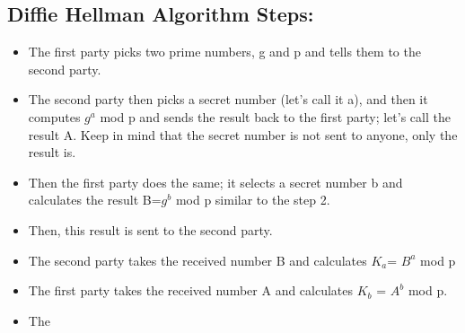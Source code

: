\subsection{Diffie Hellman Algorithm Steps:}
\vspace{-18pt}
\begin{itemize}
	\item The first party picks two prime numbers, g and p and tells them to the second party.
	\item The second party then picks a secret number (let’s call it a), and then it computes $g^a$ mod p and sends the result back to the first party; let’s call the result A. Keep in mind that the secret number is not sent to anyone, only the result is.
	\item Then the first party does the same; it selects a secret number b and calculates the result B=$g^b$ mod p similar to the step 2.
	\item Then, this result is sent to the second party.
	\item  The second party takes the received number B and calculates $K_{a}$= $B^a$ mod p
	\item The first party takes the received number A and calculates $K_{b}$ = $A^b$ mod p.
	\item The
\end{itemize}
